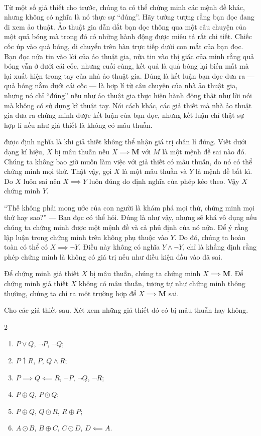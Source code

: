 \ %

Từ một số giả thiết cho trước, chúng ta có thể chứng minh các mệnh đề khác, nhưng không có nghĩa là nó thực sự ``đúng''. Hãy tưởng tượng rằng bạn đọc đang đi xem ảo thuật. Ảo thuật gia dẫn dắt bạn đọc thông qua một câu chuyện của một quả bóng mà trong đó có những hành động được miêu tả rất chi tiết. Chiếc cốc úp vào quả bóng, di chuyển trên bàn trực tiếp dưới con mắt của bạn đọc. Bạn đọc nửa tin vào lời của ảo thuật gia, nửa tin vào thị giác của mình rằng quả bóng vẫn ở dưới cái cốc, nhưng cuối cùng, kết quả là quả bóng lại biến mất mà lại xuất hiện trong tay của nhà ảo thuật gia. Đúng là kết luận bạn đọc đưa ra --- quả bóng nằm dưới cái cốc --- là hợp lí từ câu chuyện của nhà ảo thuật gia, nhưng nó chỉ ``đúng'' nếu như ảo thuật gia thực hiện hành động thật như lời nói mà không có sử dụng kĩ thuật tay. Nói cách khác, các giả thiết mà nhà ảo thuật gia đưa ra chứng minh được kết luận của bạn đọc, nhưng kết luận chỉ thật sự hợp lí nếu như giả thiết là không có mâu thuẫn.

 được định nghĩa là khi giả thiết không thể nhận giá trị chân lí đúng. Viết dưới dạng kí hiệu, $X$ bị mâu thuẫn nếu $X \implies \mathbf{M}$ với $M$ là một mệnh đề sai nào đó. Chúng ta không bao giờ muốn làm việc với giả thiết có mâu thuẫn, do nó có thể chứng minh mọi thứ. Thật vậy, gọi $X$ là một mâu thuẫn và $Y$ là mệnh đề bất kì. Do $X$ luôn sai nên $X \implies Y$ luôn đúng do định nghĩa của phép kéo theo. Vậy $X$ chứng minh $Y$.

``Thế không phải mong ước của con người là khám phá mọi thứ, chứng minh mọi thứ hay sao?'' --- Bạn đọc có thể hỏi. Đúng là như vậy, nhưng sẽ khá vô dụng nếu chúng ta chứng minh được một mệnh đề và cả phủ định của nó nữa. Để ý rằng lập luận trong chứng minh trên không phụ thuộc vào $Y$. Do đó, chúng ta hoàn toàn có thể có $X \implies \neg Y$. Điều này không có nghĩa $Y \land \neg Y$, chỉ là khẳng định rằng phép chứng minh là không có giá trị nếu như điều kiện đầu vào đã sai.

Để chứng minh giả thiết $X$ bị mâu thuẫn, chúng ta chứng minh $X \implies \mathbf{M}$. Để chứng minh giả thiết $X$ không có mâu thuẫn, tương tự như chứng minh thông thường, chúng ta chỉ ra một trường hợp để $X \implies \mathbf{M}$ sai.

\exercise Cho các giả thiết sau. Xét xem những giả thiết đó có bị mâu thuẫn hay không.
\begin{multicols}{2}
    \begin{enumerate}
        \item $P \lor Q$, $\neg P$, $\neg Q$;
        \item $P \uparrow R$, $P$, $Q \land R$;
        \item $P \implies Q \impliedby R$, $\neg P$, $\neg Q$, $\neg R$;
        \item $P \oplus Q$, $P \odot Q$;
        \item $P \oplus Q$, $Q \odot R$, $R \oplus P$;
        \item $A \odot B$, $B \oplus C$, $C \odot D$, $D \impliedby A$.
    \end{enumerate}
\end{multicols}

